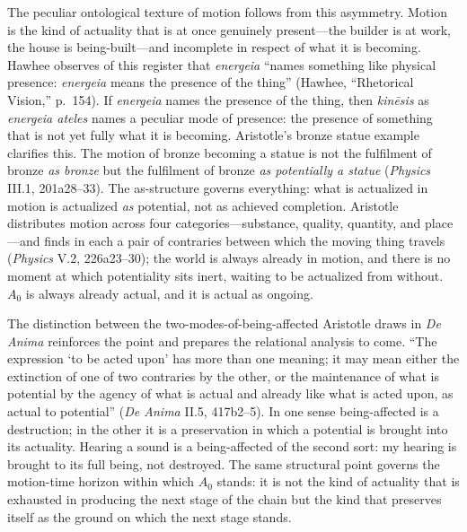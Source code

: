 \documentclass{article}
\begin{document}
The peculiar ontological texture of motion follows from this asymmetry. Motion is the kind of actuality that is at once genuinely present---the builder is at work, the house is being-built---and incomplete in respect of what it is becoming. Hawhee observes of this register that \textit{energeia} ``names something like physical presence: \textit{energeia} means the presence of the thing'' (Hawhee, ``Rhetorical Vision,'' p.~154). If \textit{energeia} names the presence of the thing, then \textit{kinēsis} as \textit{energeia ateles} names a peculiar mode of presence: the presence of something that is not yet fully what it is becoming. Aristotle's bronze statue example clarifies this. The motion of bronze becoming a statue is not the fulfilment of bronze \textit{as bronze} but the fulfilment of bronze \textit{as potentially a statue} (\textit{Physics} III.1, 201a28--33). The as-structure governs everything: what is actualized in motion is actualized \textit{as} potential, not as achieved completion. Aristotle distributes motion across four categories---substance, quality, quantity, and place---and finds in each a pair of contraries between which the moving thing travels (\textit{Physics} V.2, 226a23--30); the world is always already in motion, and there is no moment at which potentiality sits inert, waiting to be actualized from without. $A_0$ is always already actual, and it is actual as ongoing.

The distinction between the two-modes-of-being-affected Aristotle draws in \textit{De Anima} reinforces the point and prepares the relational analysis to come. ``The expression `to be acted upon' has more than one meaning; it may mean either the extinction of one of two contraries by the other, or the maintenance of what is potential by the agency of what is actual and already like what is acted upon, as actual to potential'' (\textit{De Anima} II.5, 417b2--5). In one sense being-affected is a destruction; in the other it is a preservation in which a potential is brought into its actuality. Hearing a sound is a being-affected of the second sort: my hearing is brought to its full being, not destroyed. The same structural point governs the motion-time horizon within which $A_0$ stands: it is not the kind of actuality that is exhausted in producing the next stage of the chain but the kind that preserves itself as the ground on which the next stage stands.
\end{document}
